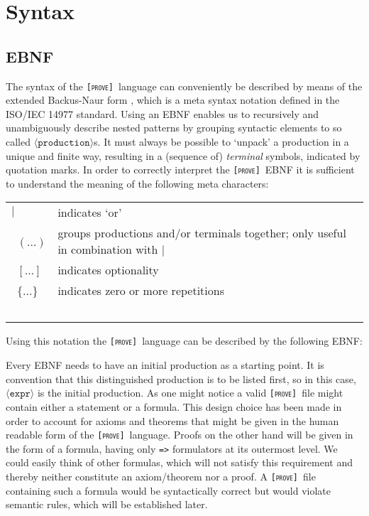 \documentclass[british]{article}
\providecommand{\tabularnewline}{\\}
\newcommand\prv{bc}
\newcommand\m[1]{\texttt{#1}}
\newcommand\name{\texttt{\textsc{[prove]}}}
\begin{document}
\section{Syntax}

\subsection{EBNF}

The syntax of the \name\ language can conveniently
be described by means of the extended Backus-Naur form \parencite{Extended}, which is a meta syntax notation defined in the ISO/IEC 14977
\parencite{ISO} standard. Using an EBNF enables us
to recursively and unambiguously describe nested patterns by grouping
syntactic elements to so called $\langle\texttt{production}\rangle$s.
It must always be possible to `unpack' a production in a unique
and finite way, resulting in a (sequence of) \textit{terminal} symbols,
indicated by quotation marks. In order to correctly interpret the
\name\ EBNF it is sufficient to understand
the meaning of the following meta characters:

\bigskip{}

\begin{doublespace}
\begin{tabular}{l|l}
$|$ & indicates `or'\tabularnewline\
$(\dots)$ & groups productions and/or terminals together; only useful in combination
with $|$\tabularnewline\
$[\dots]$ & indicates optionality\tabularnewline\
$\{\dots\}$ & indicates zero or more repetitions\tabularnewline\
\end{tabular}\bigskip{}

\end{doublespace}

Using this notation the \name\ language can be described by the following EBNF:



\medskip{}

Every EBNF needs to have an initial production as a starting point.
It is convention that this distinguished production is to be listed
first, so in this case, $\langle\texttt{expr}\rangle$ is the initial
production. As one might notice a valid \name\ file
might contain either a statement or a formula. This design choice
has been made in order to account for axioms and theorems that might
be given in the human readable form of the \name\ language.
Proofs on the other hand will be given in the form of a formula, having
only \m{=>} formulators at its outermost level. We could easily think
of other formulas, which will not satisfy this requirement and thereby
neither constitute an axiom/theorem nor a proof. A \name\
file containing such a formula would be syntactically correct but
would violate semantic rules, which will be established later. \pagebreak{}
\end{document}
